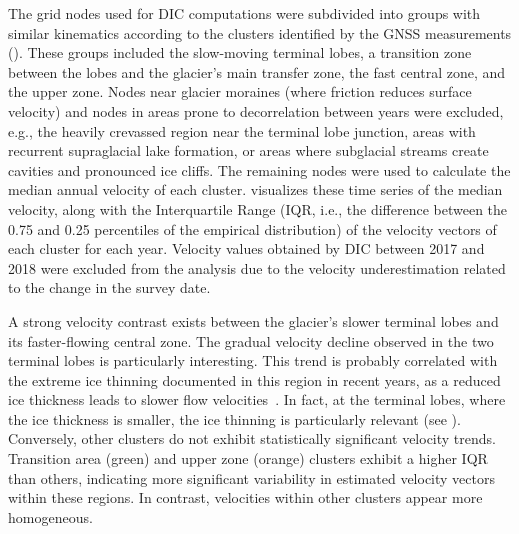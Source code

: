The grid nodes used for DIC computations were subdivided into groups with similar kinematics according to the clusters identified by the GNSS measurements (). 
These groups included the slow-moving terminal lobes, a transition zone between the lobes and the glacier's main transfer zone, the fast central zone, and the upper zone.  
Nodes near glacier moraines (where friction reduces surface velocity) and nodes in areas prone to decorrelation between years were excluded, e.g., the heavily crevassed region near the terminal lobe junction, areas with recurrent supraglacial lake formation, or areas where subglacial streams create cavities and pronounced ice cliffs.
The remaining nodes were used to calculate the median annual velocity of each cluster. 
 visualizes these time series of the median velocity, along with the Interquartile Range (IQR, i.e., the difference between the 0.75 and 0.25 percentiles of the empirical distribution) of the velocity vectors of each cluster for each year.
Velocity values obtained by DIC between 2017 and 2018 were excluded from the analysis due to the velocity underestimation related to the change in the survey date. 

A strong velocity contrast exists between the glacier's slower terminal lobes and its faster-flowing central zone.  
The gradual velocity decline observed in the two terminal lobes is particularly interesting. 
This trend is probably correlated with the extreme ice thinning documented in this region in recent years, as a reduced ice thickness leads to slower flow velocities~\citep{Cuffey2010_physics_glaciers,jiskoot2011dynamics_glacier}. 
In fact, at the terminal lobes, where the ice thickness is smaller, the ice thinning is particularly relevant (see ).
Conversely, other clusters do not exhibit statistically significant velocity trends.
Transition area (green) and upper zone (orange) clusters exhibit a higher IQR than others, indicating more significant variability in estimated velocity vectors within these regions. 
In contrast, velocities within other clusters appear more homogeneous.

